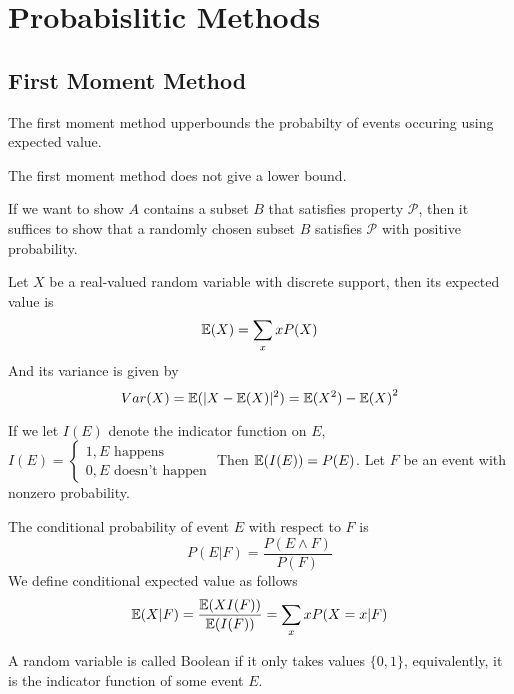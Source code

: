 \chapter{Probabislitic Methods}



\section{First Moment Method}
The first moment method upperbounds the probabilty of events occuring using expected value.
\begin{warn}
    The first moment method does not give a lower bound.
\end{warn}

If we want to show $A$ contains a subset $B$ that satisfies property $\mathcal{P}$, then it suffices to show that a randomly chosen subset $B$ satisfies $\mathcal{P}$ with positive probability.

\begin{defn}
    Let $X$ be a real-valued random variable with discrete support, then its expected value is 
    \begin{equation*}
        \mathbb{E}(X)=\sum_x xP(X)
    \end{equation*}
    And its variance is given by 
    \begin{equation*}
        Var(X)=\mathbb{E}(|X-\mathbb{E}(X)|^2)=\mathbb{E}(X^2)-{\mathbb{E}(X)}^2
    \end{equation*}
\end{defn}
If we let $I(E)$ denote the indicator function on $E$, $I(E)=\begin{cases} 1, E\text{ happens }\\ 0, E\text{ doesn't happen} \end{cases}$ Then $\mathbb{E}(I(E))=P(E)$. Let $F$ be an event with nonzero probability.

\begin{defn}
    The conditional probability of event $E$ with respect to $F$ is 
    \begin{equation*}
        P(E\vert F)=\frac{P(E\wedge F)}{P(F)}
    \end{equation*}
    We define conditional expected value as follows
    \begin{equation*}
        \mathbb{E}(X\vert F)=\frac{\mathbb{E}(XI(F))}{\mathbb{E}(I(F))}=\sum_x xP(X=x\vert F)
    \end{equation*}
\end{defn}
A random variable is called Boolean if it only takes values $\{0,1\}$, equivalently, it is the indicator function of some event $E$.



